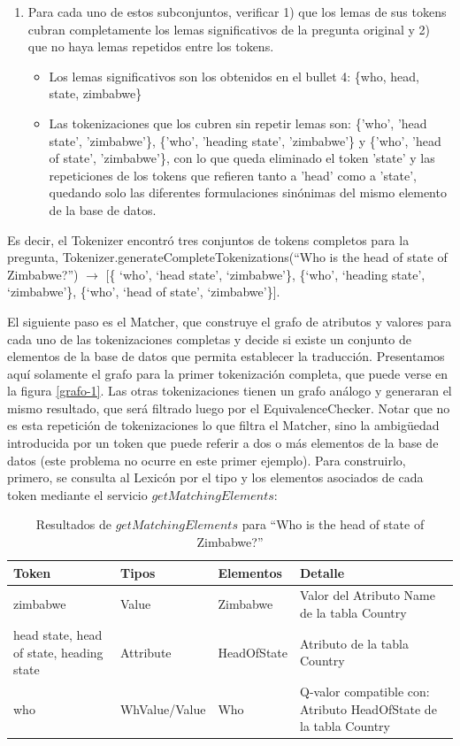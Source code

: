 \begin{enumerate}
  \item Para cada uno de estos subconjuntos, verificar 1) que los lemas de sus tokens cubran completamente
los lemas significativos de la pregunta original y 2) que no haya lemas repetidos
entre los tokens.
  \begin{itemize}
    \item Los lemas significativos son los obtenidos en el bullet 4: \{who, head, state, zimbabwe\}
    \item Las tokenizaciones que los cubren sin repetir lemas son: \{'who', 'head state', 'zimbabwe'\},
    \{'who', 'heading state', 'zimbabwe'\} y  \{'who', 'head of state', 'zimbabwe'\}, con lo que queda eliminado el token 'state' y las repeticiones de los tokens que refieren tanto a 'head' como a 'state', quedando solo las diferentes formulaciones sinónimas del mismo elemento de la base de datos.
  \end{itemize}
\end{enumerate}

Es decir, el Tokenizer encontró tres conjuntos de tokens completos para la pregunta, Tokenizer.generateCompleteTokenizations(``Who is the head of state of Zimbabwe?'') $\rightarrow$ [\{ `who', `head state', `zimbabwe'\}, \{`who', `heading state', `zimbabwe'\}, \{`who', `head of state', `zimbabwe'\}].

El siguiente paso es el Matcher, que construye el grafo de atributos y valores para cada uno de las tokenizaciones completas y decide si existe un conjunto de elementos de la base de datos que permita establecer la traducción. Presentamos aquí solamente el grafo para la primer tokenización completa, que puede verse en la figura \ref{grafo-1}. Las otras tokenizaciones tienen un grafo análogo y generaran el mismo resultado, que será filtrado luego por el EquivalenceChecker. Notar que no es esta repetición de tokenizaciones lo que filtra el Matcher, sino la ambigüedad introducida por un token que puede referir a dos o más elementos de la base de datos (este problema no ocurre en este primer ejemplo).
 Para construirlo, primero, se consulta al Lexicón por el tipo y los elementos asociados de cada token mediante el servicio $getMatchingElements$:
\begin{center}
\begin{table}[h]
\centering
\begin{tabular}{| p{3cm} | l | l | p{6cm} |}
\hline
Token & Tipos & Elementos & Detalle \\ \hline
zimbabwe & Value & Zimbabwe & Valor del Atributo Name de la tabla Country\\ \hline
head state, head of state, heading state & Attribute & HeadOfState & Atributo de la tabla Country\\ \hline
who & WhValue/Value & Who & Q-valor compatible con: Atributo HeadOfState de la tabla Country\\ \hline
\end{tabular}
\caption{Resultados de $getMatchingElements$ para ``Who is the head of state of Zimbabwe?''}
\label{table:get-matching-elements-1}
\end{table}
\end{center}


